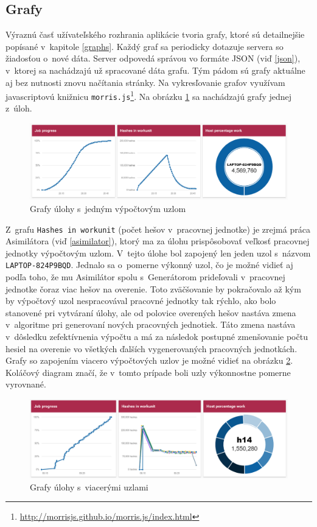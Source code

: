 \documentclass[zadani,slovak]{fitthesis}
\begin{document}
\subsection{Grafy}
Výraznú časť užívateľského rozhrania aplikácie tvoria grafy, ktoré sú detailnejšie popísané v~kapitole \ref{graphs}. Každý graf sa periodicky dotazuje servera so žiadosťou o~nové dáta. Server odpovedá správou vo formáte JSON (viď \ref{json}), v~ktorej sa nachádzajú už spracované dáta grafu. Tým pádom sú grafy aktuálne aj bez nutnosti znovu načítania stránky. Na vykresľovanie grafov využívam javascriptovú knižnicu \texttt{morris.js}\footnote{\url{http://morrisjs.github.io/morris.js/index.html}}. Na obrázku \ref{fig:graf1} sa nachádzajú grafy jednej z~úloh.
\begin{figure}[h]
    \centering
    \includegraphics[scale=0.53]{obrazky/graf1.PNG}
    \caption{Grafy úlohy s~jedným výpočtovým uzlom}
    \label{fig:graf1}
\end{figure} 
Z~grafu \texttt{Hashes in workunit} (počet hešov v~pracovnej jednotke) je zrejmá práca Asimilátora (viď \ref{asimilator}), ktorý ma za úlohu prispôsobovať veľkosť pracovnej jednotky výpočtovým uzlom. V~tejto úlohe bol zapojený len jeden uzol s~názvom \texttt{LAPTOP-824P9BQD}. Jednalo sa o~pomerne výkonný uzol, čo je možné vidieť aj podľa toho, že mu Asimilátor spolu s~Generátorom prideľovali v~pracovnej jednotke čoraz viac hešov na overenie. Toto zväčšovanie by pokračovalo až kým by výpočtový uzol nespracovával pracovné jednotky tak rýchlo, ako bolo stanovené pri vytváraní úlohy, ale od polovice overených hešov nastáva zmena v~algoritme pri generovaní nových pracovných jednotiek. Táto zmena nastáva v~dôsledku zefektívnenia výpočtu a má za následok postupné zmenšovanie počtu hesiel na overenie vo všetkých ďalších vygenerovaných pracovných jednotkách.  Grafy so zapojením viacero výpočtových uzlov je možné vidieť na obrázku \ref{fig:graf2}. Koláčový diagram značí, že v~tomto prípade boli uzly výkonnostne pomerne vyrovnané. 
\begin{figure}[H]
    \centering
    \includegraphics[scale=0.56]{obrazky/graf2.PNG}
    \caption{Grafy úlohy s~viacerými uzlami}
    \label{fig:graf2}
\end{figure}
\end{document}
